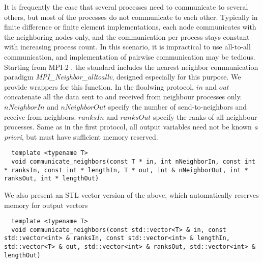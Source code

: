 \noindent
It is frequently the case that several processes need to communicate to several others, but most of the processes do not communicate to each other. Typically in finite difference or finite element implementations, each node communicates with the neighboring nodes only, and the communication per process stays constant with increasing process count. In this scenario, it is impractical to use all-to-all communication, and implementation of pairwise communication may be tedious. Starting from MPI-2 \cite{MPI-3.1}, the standard includes the nearest neighbor communication paradigm \textit{MPI\_Neighbor\_alltoallv}, designed especially for this purpose. We provide wrappers for this function.   In the floolwing protocol, $in$ and $out$ concatenate all the data sent to and received from neighbour processes only. $nNeighborIn$ and $nNeighborOut$ specify the number of send-to-neighbors and receive-from-neighbors. $ranksIn$ and $ranksOut$ specify the ranks of all neighbour processes. Same as in the first protocol, all output variables need not be known \textit{a priori}, but must have sufficient memory reserved.
\begin{mybox}
\begin{lstlisting}
  template <typename T>
  void communicate_neighbors(const T * in, int nNeighborIn, const int * ranksIn, const int * lengthIn, T * out, int & nNeighborOut, int * ranksOut, int * lengthOut)
\end{lstlisting}
\end{mybox}
\noindent
We also present an STL vector version of the above, which automatically reserves memory for output vectors
\begin{mybox}
\begin{lstlisting}
  template <typename T>
  void communicate_neighbors(const std::vector<T> & in, const std::vector<int> & ranksIn, const std::vector<int> & lengthIn, std::vector<T> & out, std::vector<int> & ranksOut, std::vector<int> & lengthOut)
\end{lstlisting}
\end{mybox}




